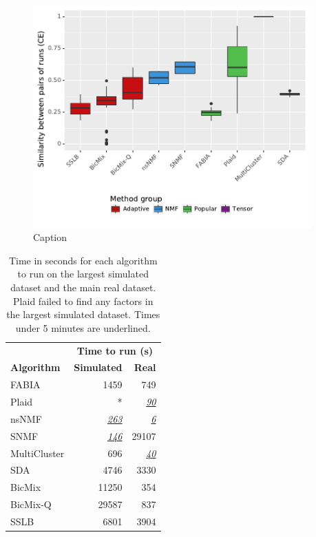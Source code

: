\documentclass[xcolor=table,final]{beamer}
\newlength{\onecolwid}
\newlength{\twocolwid}
\newcommand{\runnerup}[1] {\underline{\textit{#1}}}
\begin{document}
\begin{frame}[t]
\begin{columns}[t]
\begin{column}{\twocolwid}
\begin{columns}
\begin{column}{\onecolwid}
\end{column} %

\begin{column}{\onecolwid} %

\begin{figure}
\includegraphics[width=0.9 \textwidth]{plots/similarity_methods_K.pdf}
\caption{Caption}
\end{figure}

\begin{table}[t!]
\caption{Time in seconds for each algorithm to run on the largest simulated dataset and the main real dataset. Plaid failed to find any factors in the largest simulated dataset. Times under 5 minutes are underlined.}

\begin{tabular}{ l | r | r }
    & \multicolumn{2}{c}{\textbf{Time to run (s)}} \\
    \textbf{Algorithm} & \textbf{Simulated} & \textbf{Real} \\ \hline
\cellcolor[HTML]{50bd4c}\color[HTML]{FFFFFF}FABIA & 1459 & 749 \\
\cellcolor[HTML]{50bd4c}\color[HTML]{FFFFFF}Plaid & * & \runnerup{90} \\ \hline
\cellcolor[HTML]{3B93DC}\color[HTML]{FFFFFF}nsNMF & \runnerup{263} & \runnerup{6} \\
\cellcolor[HTML]{3B93DC}\color[HTML]{FFFFFF}SNMF & \runnerup{146} & 29107 \\ \hline
\cellcolor[HTML]{7f1c8e}\color[HTML]{FFFFFF}MultiCluster & 696 & \runnerup{40} \\
\cellcolor[HTML]{7f1c8e}\color[HTML]{FFFFFF}SDA & 4746 & 3330 \\ \hline
\cellcolor[HTML]{C50F11}\color[HTML]{FFFFFF}BicMix & 11250 & 354 \\
\cellcolor[HTML]{C50F11}\color[HTML]{FFFFFF}BicMix-Q & 29587 & 837 \\
\cellcolor[HTML]{C50F11}\color[HTML]{FFFFFF}SSLB & 6801 & 3904 \\


\end{tabular}
\end{table}
\end{column}
\end{columns}
\end{column}
\end{columns}
\end{frame}
\end{document}
